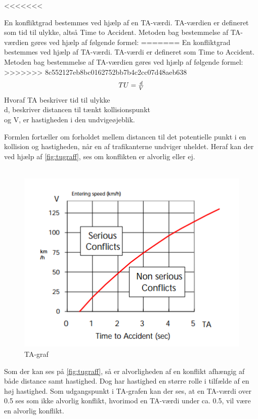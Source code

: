<<<<<<< 



 En konfliktgrad bestemmes ved hjælp af en TA-værdi. TA-værdien er defineret som tid til ulykke, altså Time to Accident. Metoden bag bestemmelse af TA-værdien gøres ved hjælp af følgende formel:
=======
 En konfliktgrad bestemmes ved hjælp af TA-værdi. TA-værdi er defineret som Time to Accident. Metoden bag bestemmelse af TA-værdien gøres ved hjælp af følgende formel:
>>>>>>> 8c552127eb8bc0162752bb7b4c2cc07d48aeb638
 \begin{equation}
  $$TU=\frac{d}{V} $$
\end{equation}
Hvoraf TA beskriver tid til ulykke \\ d, beskriver distancen til tænkt kollisionspunkt \\ og V, er hastigheden i den undvigeøjeblik.

Formlen fortæller om forholdet mellem distancen til det potentielle punkt i en kollision og hastigheden, når en af trafikanterne undviger uheldet. Heraf kan der ved hjælp af \cref{fig:tugraff}, ses om konflikten er alvorlig eller ej.
~\\\\

\begin{figure}[htbp]
  \label{fig:tagraff}
  \centering
  \begin{adjustbox}{max width=\textwidth}
    \includegraphics{billederogfigur/tugraf.png} %
 \end{adjustbox}
  \caption{TA-graf}
\end{figure}

Som der kan ses på \cref{fig:tugraff}, så er alvorligheden af en konflikt afhængig af både distance samt hastighed. Dog har hastighed en større rolle i tilfælde af en høj hastighed.
Som udgangspunkt i TA-grafen kan der ses, at en TA-værdi over 0.5 ses som ikke alvorlig konflikt, hvorimod en TA-værdi under ca. 0.5, vil være en alvorlig konflikt.




